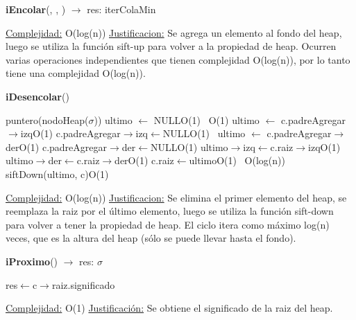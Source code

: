 \begin{Representacion}
\begin{Algoritmos}
\begin{algorithm}[H]{\textbf{iEncolar}(, , ) $\to$ res: iterColaMin}
\begin{algorithmic}[1]
		
		\medskip
		\Statex \underline{Complejidad:} O(log(n))
			\Statex \underline{Justificacion:} Se agrega un elemento al fondo del heap, luego se utiliza la función sift-up para volver a la propiedad de heap. Ocurren varias operaciones independientes que tienen complejidad O(log(n)), por lo tanto tiene una complejidad O(log(n)).
	\end{algorithmic}
\end{algorithm}


\begin{algorithm}[H]{\textbf{iDesencolar}(})
	\begin{algorithmic}[1]

		\State puntero(nodoHeap($\sigma$)) ultimo $\leftarrow$ NULL\Comment O(1)
		\,
		\Comment O(1)
			\State ultimo $\leftarrow$ c.padreAgregar$\rightarrow$izq\Comment O(1)
			\State c.padreAgregar$\rightarrow$izq$\leftarrow$NULL\Comment O(1)
			\,
		\Else
			\State ultimo $\leftarrow$ c.padreAgregar$\rightarrow$der\Comment O(1)
			\State c.padreAgregar$\rightarrow$der$\leftarrow$NULL\Comment O(1)
		\EndIf
		\State ultimo$\rightarrow$izq$\leftarrow$c.raiz$\rightarrow$izq\Comment O(1)
		\State ultimo$\rightarrow$der$\leftarrow$c.raiz$\rightarrow$der\Comment O(1)
		\State c.raiz$\leftarrow$ultimo\Comment O(1)
		\,
		 \Comment O(log(n))
			\State siftDown(ultimo, c)\Comment O(1)
		\EndWhile
		
		\medskip
		\Statex \underline{Complejidad:} O(log(n))
			\Statex \underline{Justificacion:} Se elimina el primer elemento del heap, se reemplaza la raiz por el último elemento, luego se utiliza la función sift-down para volver a tener la propiedad de heap. El ciclo itera como máximo log(n) veces, que es la altura del heap (sólo se puede llevar hasta el fondo).  
	\end{algorithmic}
\end{algorithm}


\begin{algorithm}[H]{\textbf{iProximo}() $\to$ res: $\sigma$}
	\begin{algorithmic}[1]
		
		\State res$\leftarrow$c$\rightarrow$raiz.significado
		
		\medskip
		\Statex \underline{Complejidad:} O(1)
			\Statex \underline{Justificación:} Se obtiene el significado de la raiz del heap.
	\end{algorithmic}
\end{algorithm}



\end{Algoritmos}
\end{Representacion}
